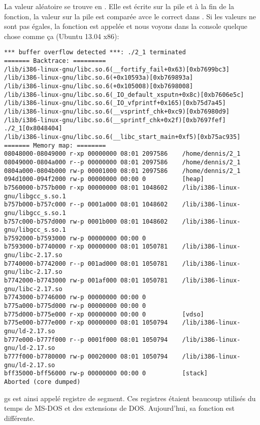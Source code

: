 

La valeur aléatoire se trouve en .
Elle est écrite sur la pile et à la fin de la fonction, la valeur sur la pile est
comparée avce le  correct dans .
Si les valeurs ne sont pas égales, la fonction  est appelée
et nous voyons dans la console quelque chose comme ça (Ubuntu 13.04 x86):

\begin{lstlisting}
*** buffer overflow detected ***: ./2_1 terminated
======= Backtrace: =========
/lib/i386-linux-gnu/libc.so.6(__fortify_fail+0x63)[0xb7699bc3]
/lib/i386-linux-gnu/libc.so.6(+0x10593a)[0xb769893a]
/lib/i386-linux-gnu/libc.so.6(+0x105008)[0xb7698008]
/lib/i386-linux-gnu/libc.so.6(_IO_default_xsputn+0x8c)[0xb7606e5c]
/lib/i386-linux-gnu/libc.so.6(_IO_vfprintf+0x165)[0xb75d7a45]
/lib/i386-linux-gnu/libc.so.6(__vsprintf_chk+0xc9)[0xb76980d9]
/lib/i386-linux-gnu/libc.so.6(__sprintf_chk+0x2f)[0xb7697fef]
./2_1[0x8048404]
/lib/i386-linux-gnu/libc.so.6(__libc_start_main+0xf5)[0xb75ac935]
======= Memory map: ========
08048000-08049000 r-xp 00000000 08:01 2097586    /home/dennis/2_1
08049000-0804a000 r--p 00000000 08:01 2097586    /home/dennis/2_1
0804a000-0804b000 rw-p 00001000 08:01 2097586    /home/dennis/2_1
094d1000-094f2000 rw-p 00000000 00:00 0          [heap]
b7560000-b757b000 r-xp 00000000 08:01 1048602    /lib/i386-linux-gnu/libgcc_s.so.1
b757b000-b757c000 r--p 0001a000 08:01 1048602    /lib/i386-linux-gnu/libgcc_s.so.1
b757c000-b757d000 rw-p 0001b000 08:01 1048602    /lib/i386-linux-gnu/libgcc_s.so.1
b7592000-b7593000 rw-p 00000000 00:00 0
b7593000-b7740000 r-xp 00000000 08:01 1050781    /lib/i386-linux-gnu/libc-2.17.so
b7740000-b7742000 r--p 001ad000 08:01 1050781    /lib/i386-linux-gnu/libc-2.17.so
b7742000-b7743000 rw-p 001af000 08:01 1050781    /lib/i386-linux-gnu/libc-2.17.so
b7743000-b7746000 rw-p 00000000 00:00 0
b775a000-b775d000 rw-p 00000000 00:00 0
b775d000-b775e000 r-xp 00000000 00:00 0          [vdso]
b775e000-b777e000 r-xp 00000000 08:01 1050794    /lib/i386-linux-gnu/ld-2.17.so
b777e000-b777f000 r--p 0001f000 08:01 1050794    /lib/i386-linux-gnu/ld-2.17.so
b777f000-b7780000 rw-p 00020000 08:01 1050794    /lib/i386-linux-gnu/ld-2.17.so
bff35000-bff56000 rw-p 00000000 00:00 0          [stack]
Aborted (core dumped)
\end{lstlisting}

gs est ainsi appelé registre de segment. Ces registres étaient beaucoup utilisés
du temps de MS-DOS et des extensions de DOS.
Aujourd'hui, sa fonction est différente.

